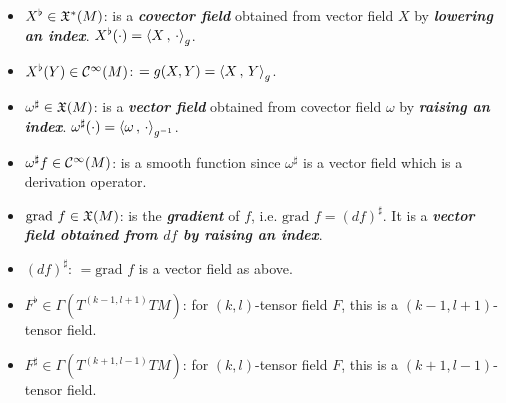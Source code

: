 \documentclass[11pt]{article}
\begin{document}
\begin{itemize}
\item $X^{\flat} \in {\mathfrak X}^{*}(M)$: \quad is a \emph{\textbf{covector field}} obtained from vector field $X$ by \emph{\textbf{lowering an index}}. $X^{\flat}(\cdot) = \left\langle X\,,\, \cdot \right\rangle_g$.

\item $X^{\flat}(Y) \in  {\mathcal C}^{\infty}(M)$: \quad  $= g(X, Y) = \left\langle X\,,\, Y \right\rangle_g$.

\item $\omega^{\sharp} \in {\mathfrak X}(M)$: \quad is a \emph{\textbf{vector field}} obtained from covector field $\omega$ by \emph{\textbf{raising an index}}. $\omega^{\sharp}(\cdot) = \left\langle \omega\,,\, \cdot \right\rangle_{g^{-1}}$.

\item $\omega^{\sharp}f \in {\mathcal C}^{\infty}(M)$: \quad is a smooth function since $\omega^{\sharp}$ is a vector field which is a derivation operator.

\item $\text{grad }f  \in {\mathfrak X}(M)$: \quad is the \emph{\textbf{gradient}} of $f$, i.e. $\text{grad }f = (df)^{\sharp}$. It is a \emph{\textbf{vector field obtained from $df$ by raising an index}}.

\item $(df)^{\sharp}$: \quad $= \text{grad }f$ is a vector field as above.

\item $F^{\flat} \in \Gamma(T^{(k-1, l+1)}TM)$: \quad for $(k,l)$-tensor field $F$, this is a $(k-1, l+1)$-tensor field.

\item $F^{\sharp} \in \Gamma(T^{(k+1, l-1)}TM)$: \quad for $(k,l)$-tensor field $F$, this is a $(k+1, l-1)$-tensor field.
\end{itemize}
\end{document}
